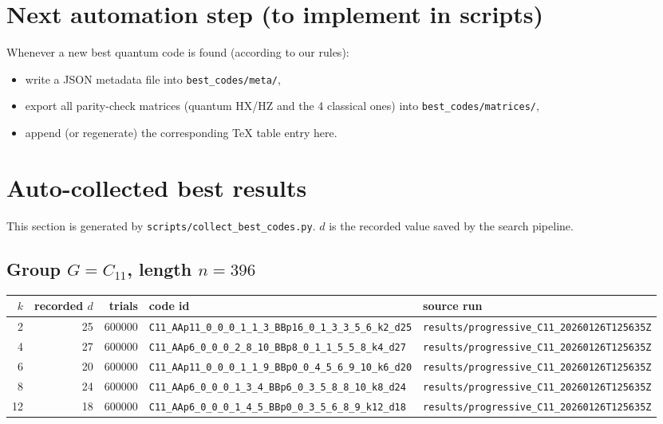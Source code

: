 \documentclass[11pt]{article}
\begin{document}
\section{Next automation step (to implement in scripts)}
Whenever a new best quantum code is found (according to our rules):
\begin{itemize}
  \item write a JSON metadata file into \texttt{best\_codes/meta/},
  \item export all parity-check matrices (quantum HX/HZ and the 4 classical ones)
        into \texttt{best\_codes/matrices/},
  \item append (or regenerate) the corresponding TeX table entry here.
\end{itemize}


\section{Auto-collected best results}
This section is generated by \texttt{scripts/collect\_best\_codes.py}.
$d$ is the recorded value saved by the search pipeline.

\subsection{Group $G = C_{11}$, length $n=396$}

\begin{longtable}{@{}r r r l l@{}}
\toprule
$k$ & recorded $d$ & trials & code id & source run \\
\midrule
\endhead
2 & 25 & 600000 & \texttt{C11\_AAp11\_0\_0\_0\_1\_1\_3\_BBp16\_0\_1\_3\_3\_5\_6\_k2\_d25} & \texttt{results/progressive\_C11\_20260126T125635Z} \\
4 & 27 & 600000 & \texttt{C11\_AAp6\_0\_0\_0\_2\_8\_10\_BBp8\_0\_1\_1\_5\_5\_8\_k4\_d27} & \texttt{results/progressive\_C11\_20260126T125635Z} \\
6 & 20 & 600000 & \texttt{C11\_AAp11\_0\_0\_0\_1\_1\_9\_BBp0\_0\_4\_5\_6\_9\_10\_k6\_d20} & \texttt{results/progressive\_C11\_20260126T125635Z} \\
8 & 24 & 600000 & \texttt{C11\_AAp6\_0\_0\_0\_1\_3\_4\_BBp6\_0\_3\_5\_8\_8\_10\_k8\_d24} & \texttt{results/progressive\_C11\_20260126T125635Z} \\
12 & 18 & 600000 & \texttt{C11\_AAp6\_0\_0\_0\_1\_4\_5\_BBp0\_0\_3\_5\_6\_8\_9\_k12\_d18} & \texttt{results/progressive\_C11\_20260126T125635Z} \\
\bottomrule
\end{longtable}
\end{document}
